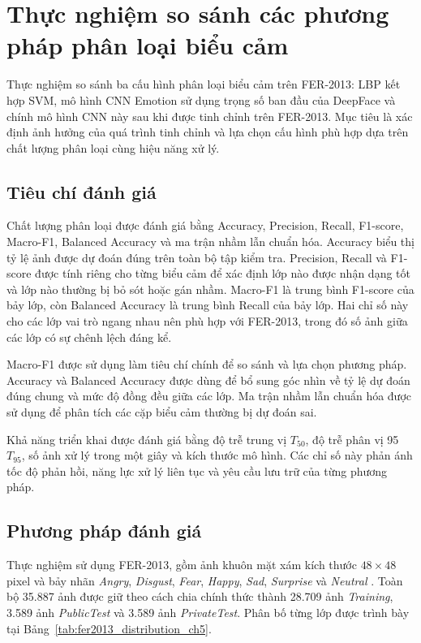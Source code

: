 \documentclass[../LuanVan.tex]{subfiles}
\begin{document}
\section{Thực nghiệm so sánh các phương pháp phân loại biểu cảm}
\label{section:5.2}

Thực nghiệm so sánh ba cấu hình phân loại biểu cảm trên FER-2013: LBP kết hợp SVM, mô hình CNN Emotion sử dụng trọng số ban đầu của DeepFace và chính mô hình CNN này sau khi được tinh chỉnh trên FER-2013. Mục tiêu là xác định ảnh hưởng của quá trình tinh chỉnh và lựa chọn cấu hình phù hợp dựa trên chất lượng phân loại cùng hiệu năng xử lý.

\subsection{Tiêu chí đánh giá}
\label{subsection:5.2.1}

Chất lượng phân loại được đánh giá bằng Accuracy, Precision, Recall, F1-score, Macro-F1, Balanced Accuracy và ma trận nhầm lẫn chuẩn hóa. Accuracy biểu thị tỷ lệ ảnh được dự đoán đúng trên toàn bộ tập kiểm tra. Precision, Recall và F1-score được tính riêng cho từng biểu cảm để xác định lớp nào được nhận dạng tốt và lớp nào thường bị bỏ sót hoặc gán nhầm. Macro-F1 là trung bình F1-score của bảy lớp, còn Balanced Accuracy là trung bình Recall của bảy lớp. Hai chỉ số này cho các lớp vai trò ngang nhau nên phù hợp với FER-2013, trong đó số ảnh giữa các lớp có sự chênh lệch đáng kể.

Macro-F1 được sử dụng làm tiêu chí chính để so sánh và lựa chọn phương pháp. Accuracy và Balanced Accuracy được dùng để bổ sung góc nhìn về tỷ lệ dự đoán đúng chung và mức độ đồng đều giữa các lớp. Ma trận nhầm lẫn chuẩn hóa được sử dụng để phân tích các cặp biểu cảm thường bị dự đoán sai.

Khả năng triển khai được đánh giá bằng độ trễ trung vị $T_{50}$, độ trễ phân vị 95 $T_{95}$, số ảnh xử lý trong một giây và kích thước mô hình. Các chỉ số này phản ánh tốc độ phản hồi, năng lực xử lý liên tục và yêu cầu lưu trữ của từng phương pháp.

\subsection{Phương pháp đánh giá}
\label{subsection:5.2.2}

Thực nghiệm sử dụng FER-2013, gồm ảnh khuôn mặt xám kích thước $48\times48$ pixel và bảy nhãn \textit{Angry}, \textit{Disgust}, \textit{Fear}, \textit{Happy}, \textit{Sad}, \textit{Surprise} và \textit{Neutral} \cite{goodfellow2013challenges}. Toàn bộ 35.887 ảnh được giữ theo cách chia chính thức thành 28.709 ảnh \textit{Training}, 3.589 ảnh \textit{PublicTest} và 3.589 ảnh \textit{PrivateTest}. Phân bố từng lớp được trình bày tại Bảng~\ref{tab:fer2013_distribution_ch5}.
\end{document}
